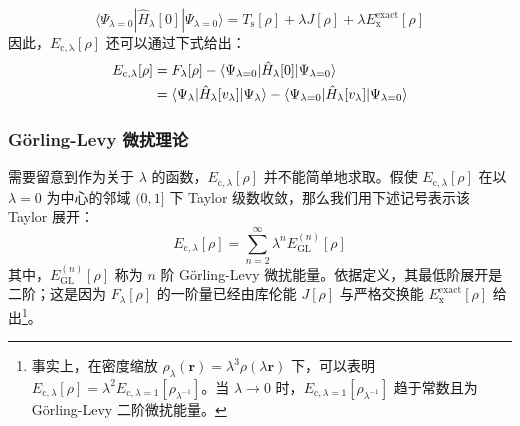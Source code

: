 \begin{equation*}
  \langle \Psi_{\lambda=0} | \hat H_\lambda [0] | \Psi_{\lambda=0} \rangle = T_\mathrm{s} [\rho] + \lambda J[\rho] + \lambda E_\mathrm{x}^\mathrm{exact} [\rho]
\end{equation*}
因此，$E_\mathrm{c, \lambda} [\rho]$ 还可以通过下式给出：
\begin{align}
  \label{eq.E-c-lambda-by-wavefunc}
  E_\mathrm{c, \lambda} [\rho] &= F_{\lambda} [\rho] - \langle \Psi_{\lambda=0} | \hat H_\lambda [0] | \Psi_{\lambda=0} \rangle \notag\\
  &= \langle \Psi_{\lambda} | \hat H_\lambda [v_\mathrm{\lambda}] | \Psi_{\lambda} \rangle - \langle \Psi_{\lambda=0} | \hat H_\lambda [v_\mathrm{\lambda}] | \Psi_{\lambda=0} \rangle
\end{align}

\subsubsection{G\"orling-Levy 微扰理论}

需要留意到作为关于 $\lambda$ 的函数，$E_{\mathrm{c}, \lambda} [\rho]$ 并不能简单地求取。假使 $E_{\mathrm{c}, \lambda} [\rho]$ 在以 $\lambda=0$ 为中心的邻域 $(0, 1]$ 下 Taylor 级数收敛，那么我们用下述记号表示该 Taylor 展开：
\begin{equation}
  \label{eq.e-c-lambda}
  E_{\mathrm{c}, \lambda} [\rho] = \sum_{n=2}^{\infty} \lambda^n E_\mathrm{GL}^{(n)} [\rho]
\end{equation}
其中，$E_\mathrm{GL}^{(n)} [\rho]$ 称为 $n$ 阶 G\"orling-Levy 微扰能量\cite{Goerling-Levy.PRB.1993, Goerling-Levy.PRA.1994}。依据定义，其最低阶展开是二阶；这是因为 $F_\lambda[\rho]$ 的一阶量已经由库伦能 $J[\rho]$ 与严格交换能 $E_\mathrm{x}^\mathrm{exact}[\rho]$ 给出\footnote{事实上，在密度缩放 $\rho_\lambda(\bm{r}) = \lambda^3 \rho(\lambda \bm{r})$ 下，可以表明 $E_{\mathrm{c}, \lambda} [\rho] = \lambda^2 E_{\mathrm{c}, \lambda=1} [\rho_{\lambda^{-1}}]$\cite{Levy-Perdew.PRA.1985, Levy-Parr.JCP.1985}。当 $\lambda \rightarrow 0$ 时，$E_{\mathrm{c}, \lambda=1} [\rho_{\lambda^{-1}}]$ 趋于常数且为 G\"orling-Levy 二阶微扰能量\cite{Goerling-Levy.PRB.1993}。}。


